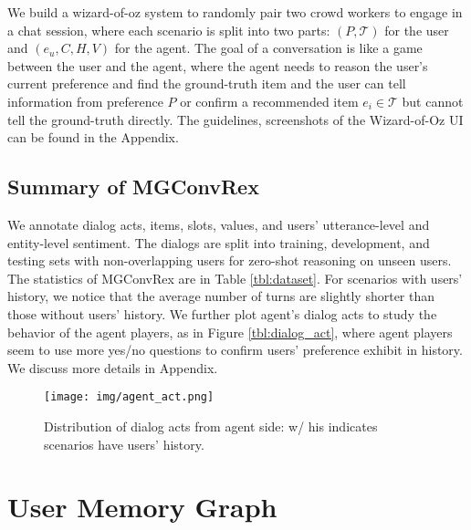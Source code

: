 \documentclass[11pt,a4paper]{article}
\begin{document}
We build a wizard-of-oz system to randomly pair two crowd workers to engage in a chat session, where each scenario is split into two parts:
$(P, \mathcal{T})$ for the user and $(e_u, C, H, V)$ for the agent.
The goal of a conversation is like a game between the user and the agent, where the agent needs to reason the user's current preference and find the ground-truth item and the user can tell information from preference $P$ or confirm a recommended item $e_i \in \mathcal{T}$ but cannot tell the ground-truth directly. 
The guidelines, screenshots of the Wizard-of-Oz UI can be found in the Appendix.

\subsection{Summary of MGConvRex}
\label{sec:dataset_stat}
We annotate dialog acts, items, slots, values, and users' utterance-level and entity-level sentiment.
The dialogs are split into training, development, and testing sets with non-overlapping users for 
zero-shot reasoning on unseen users.
The statistics of MGConvRex are in Table \ref{tbl:dataset}.
For scenarios with users' history, we notice that the average number of turns are slightly shorter than those without users' history.
We further plot agent's dialog acts to study the behavior of the agent players, as in Figure \ref{tbl:dialog_act}, where agent players seem to use more yes/no questions to confirm users' preference exhibit in history.
We discuss more details in Appendix.

\begin{figure}[t]
\centering    
\texttt{[image: img/agent\_act.png]}
    \caption{Distribution of dialog acts from agent side: w/ his indicates scenarios have users' history.}
\label{fig:agent_act}
\end{figure}


\section{User Memory Graph}
\label{sec:graph}
\end{document}
